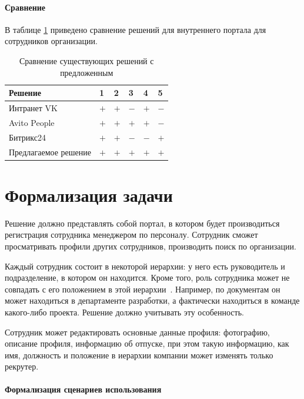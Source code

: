 \paragraph{Сравнение} \mbox{}

В таблице \ref{table:anal_compare} приведено сравнение решений для внутреннего портала для сотрудников организации.

\begin{table}[h]
  \caption{\label{table:anal_compare} Сравнение существующих решений с предложенным}
  \begin{center}
    \begin{tabular}{|l|l|l|l|l|l|}
      \hline
      Решение              & 1 & 2 & 3 & 4 & 5 \\ \hline
      Интранет VK~\cite{intranet_vk}          & $+$ & $+$ & $-$ & $+$ & $-$ \\ \hline
      Avito People~\cite{intranet_avito}         & $+$ & $+$ & $+$ & $+$ & $-$ \\ \hline
      Битрикс24~\cite{bitrix24}           & $+$ & $+$ & $-$ & $-$ & $+$ \\ \hline
      Предлагаемое решение & $+$ & $+$ & $+$ & $+$ & $+$ \\ \hline
    \end{tabular}
  \end{center}
\end{table}

\section{Формализация задачи}
Решение должно представлять собой портал, в котором будет производиться регистрация сотрудника менеджером по персоналу. Сотрудник сможет просматривать профили других сотрудников, производить поиск по организации.

Каждый сотрудник состоит в некоторой иерархии: у него есть руководитель и подразделение, в котором он находится. Кроме того, роль сотрудника может не совпадать с его положением в этой иерархии~\cite{intranet_avito}. Например, по документам он может находиться в департаменте разработки, а фактически находиться в команде какого-либо проекта. Решение должно учитывать эту особенность.

Сотрудник может редактировать основные данные профиля: фотографию, описание профиля, информацию об отпуске, при этом такую информацию, как имя, должность и положение в иерархии компании может изменять только рекрутер.


\paragraph{Формализация сценариев использования} \mbox{}

